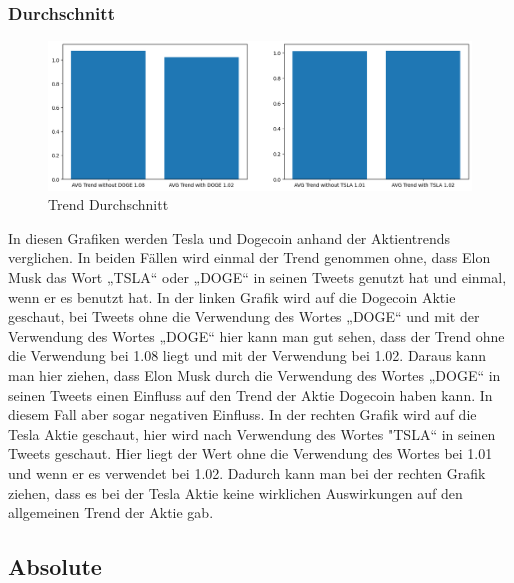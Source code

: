 \documentclass{article}
\begin{document}
\subsubsection{Durchschnitt}
\begin{figure}[!htb]
  	\includegraphics[width=\textwidth, center]{../imgs/Trend_Durchschnitt.png}
 	\caption{Trend Durchschnitt}
 	\label{fig:Trend Durchschnitt}
\end{figure}
In diesen Grafiken werden Tesla und Dogecoin anhand der Aktientrends verglichen. In beiden Fällen wird einmal der Trend genommen ohne, dass Elon Musk das Wort „TSLA“ oder „DOGE“ in seinen Tweets genutzt hat und einmal, wenn er es benutzt hat.
In der linken Grafik wird auf die Dogecoin Aktie geschaut, bei Tweets ohne die Verwendung des Wortes „DOGE“ und mit der Verwendung des Wortes „DOGE“ hier kann man gut sehen, dass der Trend ohne die Verwendung bei 1.08 liegt und mit der Verwendung bei 1.02.
Daraus kann man hier ziehen, dass Elon Musk durch die Verwendung des Wortes „DOGE“ in seinen Tweets einen Einfluss auf den Trend der Aktie Dogecoin haben kann. In diesem Fall aber sogar negativen Einfluss.
In der rechten Grafik wird auf die Tesla Aktie geschaut, hier wird nach Verwendung des Wortes "TSLA“ in seinen Tweets geschaut. Hier liegt der Wert ohne die Verwendung des Wortes bei 1.01 und wenn er es verwendet bei 1.02.
Dadurch kann man bei der rechten Grafik ziehen, dass es bei der Tesla Aktie keine wirklichen Auswirkungen auf den allgemeinen Trend der Aktie gab.


\subsection{Absolute}
\end{document}
